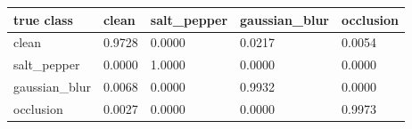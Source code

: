\begin{tabular}{lllll}
\hline
true class & clean & salt\_pepper & gaussian\_blur & occlusion \\
\hline
clean & 0.9728 & 0.0000 & 0.0217 & 0.0054 \\
salt\_pepper & 0.0000 & 1.0000 & 0.0000 & 0.0000 \\
gaussian\_blur & 0.0068 & 0.0000 & 0.9932 & 0.0000 \\
occlusion & 0.0027 & 0.0000 & 0.0000 & 0.9973 \\
\hline
\end{tabular}
